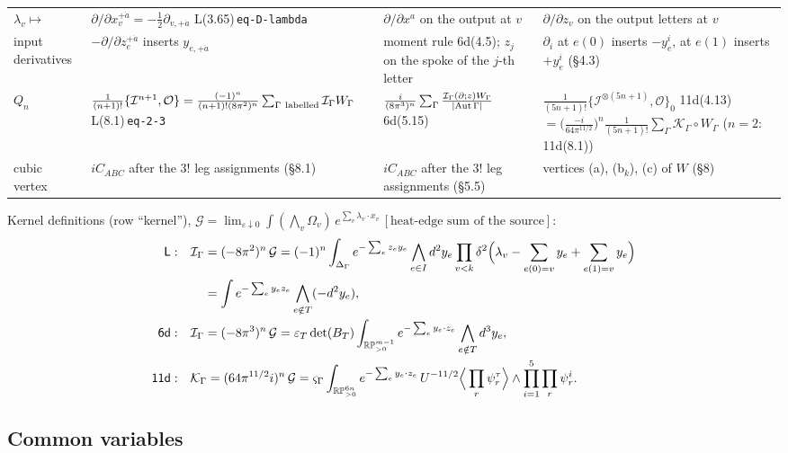 \documentclass[10pt,a4paper]{article}
\numberwithin{equation}{section}
\newcommand{\cI}{\mathcal I}
\newcommand{\cK}{\mathcal K}
\newcommand{\cO}{\mathcal O}
\newcommand{\RPp}[1]{\mathbb{RP}^{#1}_{>0}}
\newcommand{\LL}[2]{\textsf{L}(#1){\scriptsize\,\texttt{#2}}}
\newcommand{\Sd}[1]{\textsf{6d}(#1)}
\newcommand{\Ed}[1]{\textsf{11d}(#1)}
\begin{document}
{\begin{longtable}{@{}>{\raggedright\arraybackslash}p{1.8cm}>{\raggedright\arraybackslash}p{4.5cm}>{\raggedright\arraybackslash}p{4.3cm}>{\raggedright\arraybackslash}p{4.9cm}@{}}
$\lambda_v\mapsto$ & $\partial/\partial x_v^{+\dot a}=-\frac12\partial_{v,+\dot a}$ \LL{3.65}{eq-D-lambda} & $\partial/\partial x^a$ on the output at $v$ & $\partial/\partial z_v$ on the output letters at $v$\\
input derivatives & $-\partial/\partial z_e^{+\dot a}$ inserts $y_{e,+\dot a}$ & moment rule \Sd{4.5}; $z_j$ on the spoke of the $j$-th letter & $\partial_i$ at $e(0)$ inserts $-y^i_e$, at $e(1)$ inserts $+y^i_e$ (\S4.3)\\
$Q_n$ & $\frac1{(n+1)!}\{\cI^{n+1},\cO\}=\frac{(-1)^n}{(n+1)!(8\pi^2)^n}\sum_{\Gamma\ \rm labelled}\cI_\Gamma W_\Gamma$ \LL{8.1}{eq-2-3} & $\frac i{(8\pi^3)^n}\sum_\Gamma\frac{\cI_\Gamma(\partial;z)W_\Gamma}{|{\rm Aut}\,\Gamma|}$ \Sd{5.15} & $\frac1{(5n+1)!}\{\cI^{\otimes(5n+1)},\cO\}_0$ \Ed{4.13} $=\big(\frac{-i}{64\pi^{11/2}}\big)^n\frac1{(5n+1)!}\sum_\Gamma\cK_\Gamma\circ W_\Gamma$ ($n=2$: \Ed{8.1})\\
cubic vertex & $iC_{ABC}$ after the $3!$ leg assignments (\S8.1) & $iC_{ABC}$ after the $3!$ leg assignments (\S5.5) & vertices (a), (b$_k$), (c) of $W$ (\S8)\\
\bottomrule
\end{longtable}}

Kernel definitions (row ``kernel''), $\mathcal G=\lim_{\varepsilon\downarrow0}\int(\bigwedge_{v}\Omega_v)\,e^{\sum_v\lambda_v\cdot x_v}\,[\text{heat-edge sum of the source}]$:
\begin{align}
\textsf{L}:\quad&\cI_\Gamma=(-8\pi^2)^n\,\mathcal G=(-1)^n\int_{\Delta_\Gamma}e^{-\sum_ez_ey_e}\bigwedge_{e\in I}d^2y_e\prod_{v<k}\delta^2\Big(\lambda_v-\sum_{e(0)=v}y_e+\sum_{e(1)=v}y_e\Big)\notag\\
&\phantom{\cI_\Gamma}=\int e^{-\sum_ey_ez_e}\bigwedge_{e\notin T}(-d^2y_e),\label{eq-def-L}\\
\textsf{6d}:\quad&\cI_\Gamma=(-8\pi^3)^n\,\mathcal G=\varepsilon_T\det(B_T)\int_{\RPp{m-1}}e^{-\sum_ey_e\cdot z_e}\bigwedge_{e\notin T}d^3y_e,\label{eq-def-6}\\
\textsf{11d}:\quad&\cK_\Gamma=(64\pi^{11/2}i)^n\,\mathcal G=\varsigma_\Gamma\int_{\RPp{6n}}e^{-\sum_ey_e\cdot z_e}\,U^{-11/2}\Big\langle\prod_r\psi^\tau_r\Big\rangle\wedge\prod_{i=1}^5\prod_r\psi^i_r .\label{eq-def-11}
\end{align}

\subsection{Common variables}
\end{document}
